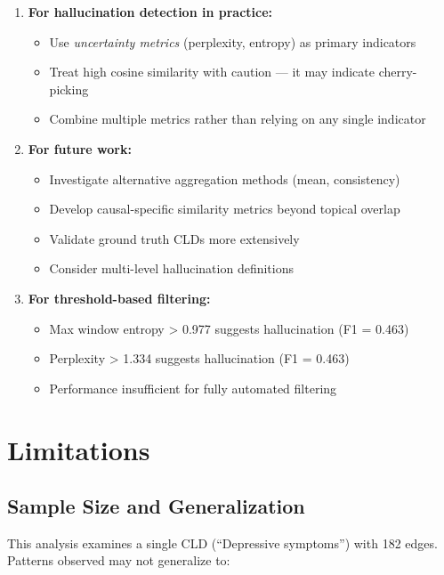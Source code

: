 \begin{enumerate}
    \item \textbf{For hallucination detection in practice:}
    \begin{itemize}
        \item Use \textit{uncertainty metrics} (perplexity, entropy) as primary indicators
        \item Treat high cosine similarity with caution --- it may indicate cherry-picking
        \item Combine multiple metrics rather than relying on any single indicator
    \end{itemize}
    
    \item \textbf{For future work:}
    \begin{itemize}
        \item Investigate alternative aggregation methods (mean, consistency)
        \item Develop causal-specific similarity metrics beyond topical overlap
        \item Validate ground truth CLDs more extensively
        \item Consider multi-level hallucination definitions
    \end{itemize}
    
    \item \textbf{For threshold-based filtering:}
    \begin{itemize}
        \item Max window entropy > 0.977 suggests hallucination (F1 = 0.463)
        \item Perplexity > 1.334 suggests hallucination (F1 = 0.463)
        \item Performance insufficient for fully automated filtering
    \end{itemize}
\end{enumerate}

\section{Limitations}

\subsection{Sample Size and Generalization}

This analysis examines a single CLD (``Depressive symptoms'') with 182 edges. Patterns observed may not generalize to:

